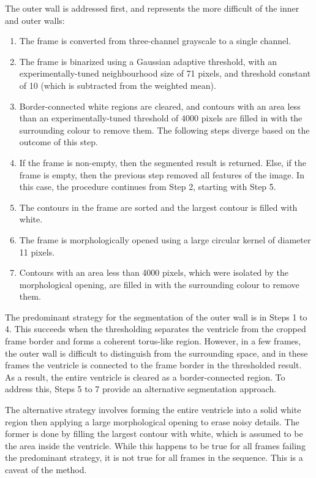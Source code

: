 The outer wall is addressed first, and represents the more difficult of the inner and outer walls:

\begin{enumerate}
  \item The frame is converted from three-channel grayscale to a single channel.

  \item The frame is binarized using a Gaussian adaptive threshold, with an experimentally-tuned neighbourhood size of 71 pixels, and threshold constant of 10 (which is subtracted from the weighted mean).

  \item Border-connected white regions are cleared, and contours with an area less than an experimentally-tuned threshold of 4000 pixels are filled in with the surrounding colour to remove them. The following steps diverge based on the outcome of this step.

  \item If the frame is non-empty, then the segmented result is returned. Else, if the frame is empty, then the previous step removed all features of the image. In this case, the procedure continues from Step 2, starting with Step 5.

  \item The contours in the frame are sorted and the largest contour is filled with white.

  \item The frame is morphologically opened using a large circular kernel of diameter 11 pixels.

  \item Contours with an area less than 4000 pixels, which were isolated by the morphological opening, are filled in with the surrounding colour to remove them.

\end{enumerate}

The predominant strategy for the segmentation of the outer wall is in Steps 1 to 4. This succeeds when the thresholding separates the ventricle from the cropped frame border and forms a coherent torus-like region. However, in a few frames, the outer wall is difficult to distinguish from the surrounding space, and in these frames the ventricle is connected to the frame border in the thresholded result. As a result, the entire ventricle is cleared as a border-connected region. To address this, Steps 5 to 7 provide an alternative segmentation approach.

The alternative strategy involves forming the entire ventricle into a solid white region then applying a large morphological opening to erase noisy details. The former is done by filling the largest contour with white, which is assumed to be the area inside the ventricle. While this happens to be true for all frames failing the predominant strategy, it is not true for all frames in the sequence. This is a caveat of the method.

